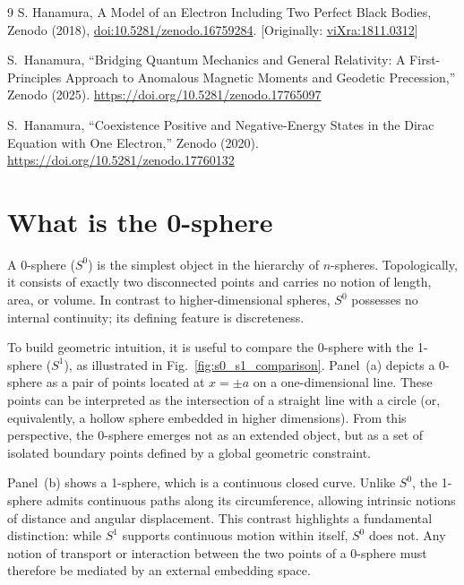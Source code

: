 \documentclass[%
 reprint,
 amsmath,amssymb,
 aps,
 prb,
]{revtex4-2}
\numberwithin{equation}{section}
\begin{document}
\begin{thebibliography}{9}
S. Hanamura, A Model of an Electron Including Two Perfect Black Bodies, Zenodo (2018), \href{https://doi.org/10.5281/zenodo.16759284}{doi:10.5281/zenodo.16759284}. [Originally: \href{https://vixra.org/abs/1811.0312}{viXra:1811.0312}]

S.~Hanamura, ``Bridging Quantum Mechanics and General Relativity: A First-Principles Approach to Anomalous Magnetic Moments and Geodetic Precession,'' Zenodo (2025). \href{https://doi.org/10.5281/zenodo.17765097}{https://doi.org/10.5281/zenodo.17765097}

S.~Hanamura, ``Coexistence Positive and Negative-Energy States in the Dirac Equation with One Electron,'' Zenodo (2020). \href{https://doi.org/10.5281/zenodo.17760132}{https://doi.org/10.5281/zenodo.17760132}

\end{thebibliography}

\clearpage


\appendix


\section{What is the 0-sphere}
\label{sec:what_is_the_0_sphere}

A 0-sphere ($S^0$) is the simplest object in the hierarchy of $n$-spheres.
Topologically, it consists of exactly two disconnected points and carries no notion of length, area, or volume.
In contrast to higher-dimensional spheres, $S^0$ possesses no internal continuity; its defining feature is discreteness.

To build geometric intuition, it is useful to compare the 0-sphere with the 1-sphere ($S^1$), as illustrated in Fig.~\ref{fig:s0_s1_comparison}.
Panel~(a) depicts a 0-sphere as a pair of points located at $x=\pm a$ on a one-dimensional line.
These points can be interpreted as the intersection of a straight line with a circle (or, equivalently, a hollow sphere embedded in higher dimensions).
From this perspective, the 0-sphere emerges not as an extended object, but as a set of isolated boundary points defined by a global geometric constraint.

Panel~(b) shows a 1-sphere, which is a continuous closed curve.
Unlike $S^0$, the 1-sphere admits continuous paths along its circumference, allowing intrinsic notions of distance and angular displacement.
This contrast highlights a fundamental distinction: while $S^1$ supports continuous motion within itself, $S^0$ does not.
Any notion of transport or interaction between the two points of a 0-sphere must therefore be mediated by an external embedding space.
\end{document}
